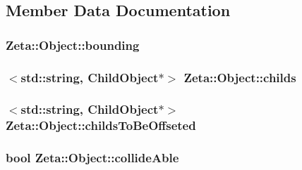 \subsection{Member Data Documentation}
\hypertarget{classZeta_1_1Object_a7dc7d781f8f3d6f38860b4df26fc58c4}{
\subsubsection[{bounding}]{ Zeta\+::\+Object\+::bounding\hspace{0.3cm}{\ttfamily [protected]}}}\label{classZeta_1_1Object_a7dc7d781f8f3d6f38860b4df26fc58c4}
\hypertarget{classZeta_1_1Object_a096fb830516bf1ec03d3e393e59c9538}{
\subsubsection[{childs}]{$<$std\+::string, {\bf Child\+Object}$\ast$$>$ Zeta\+::\+Object\+::childs\hspace{0.3cm}{\ttfamily [protected]}}}\label{classZeta_1_1Object_a096fb830516bf1ec03d3e393e59c9538}
\hypertarget{classZeta_1_1Object_a655c8364527b4257b0a8f565fc633d9d}{
\subsubsection[{childs\+To\+Be\+Offseted}]{$<$std\+::string, {\bf Child\+Object}$\ast$$>$ Zeta\+::\+Object\+::childs\+To\+Be\+Offseted\hspace{0.3cm}{\ttfamily [protected]}}}\label{classZeta_1_1Object_a655c8364527b4257b0a8f565fc633d9d}
\hypertarget{classZeta_1_1Object_ae01335456c115c493d4bb9c67c3897ce}{
\subsubsection[{collide\+Able}]{\setlength{\rightskip}{0pt plus 5cm}bool Zeta\+::\+Object\+::collide\+Able\hspace{0.3cm}{\ttfamily [protected]}}}\label{classZeta_1_1Object_ae01335456c115c493d4bb9c67c3897ce}

